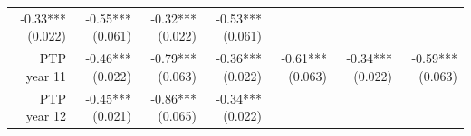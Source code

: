 \documentclass[]{article}
\begin{document}
\begin{longtable}[c]{@{}rrrrrrr@{}}
\begin{minipage}[t]{0.11\columnwidth}
-0.33*** (0.022)
\strut\end{minipage} &
\begin{minipage}[t]{0.12\columnwidth}\raggedleft\strut
-0.55*** (0.061)
\strut\end{minipage} &
\begin{minipage}[t]{0.11\columnwidth}\raggedleft\strut
-0.32*** (0.022)
\strut\end{minipage} &
\begin{minipage}[t]{0.11\columnwidth}\raggedleft\strut
-0.53*** (0.061)
\strut\end{minipage}\tabularnewline
\begin{minipage}[t]{0.12\columnwidth}\raggedleft\strut
PTP year 11
\strut\end{minipage} &
\begin{minipage}[t]{0.11\columnwidth}\raggedleft\strut
-0.46*** (0.022)
\strut\end{minipage} &
\begin{minipage}[t]{0.12\columnwidth}\raggedleft\strut
-0.79*** (0.063)
\strut\end{minipage} &
\begin{minipage}[t]{0.11\columnwidth}\raggedleft\strut
-0.36*** (0.022)
\strut\end{minipage} &
\begin{minipage}[t]{0.12\columnwidth}\raggedleft\strut
-0.61*** (0.063)
\strut\end{minipage} &
\begin{minipage}[t]{0.11\columnwidth}\raggedleft\strut
-0.34*** (0.022)
\strut\end{minipage} &
\begin{minipage}[t]{0.11\columnwidth}\raggedleft\strut
-0.59*** (0.063)
\strut\end{minipage}\tabularnewline
\begin{minipage}[t]{0.12\columnwidth}\raggedleft\strut
PTP year 12
\strut\end{minipage} &
\begin{minipage}[t]{0.11\columnwidth}\raggedleft\strut
-0.45*** (0.021)
\strut\end{minipage} &
\begin{minipage}[t]{0.12\columnwidth}\raggedleft\strut
-0.86*** (0.065)
\strut\end{minipage} &
\begin{minipage}[t]{0.11\columnwidth}\raggedleft\strut
-0.34*** (0.022)
\strut\end{minipage} &
\begin{minipage}[t]{0.12\columnwidth}\raggedleft\strut

\end{minipage}
\end{longtable}
\end{document}
